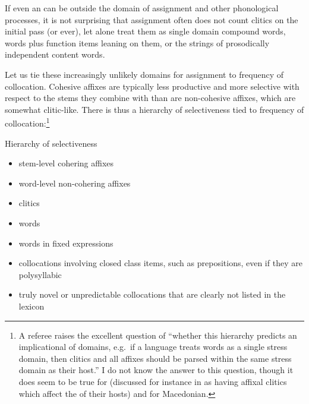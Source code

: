 \documentclass[output=paper,
modfonts
]{LSP/langsci}
\begin{document}
\begin{exe}
\noindent If even an  can be outside the domain of  assignment and other phonological processes, it is not surprising that  assignment often does not count clitics on the initial pass (or ever), let alone treat them as single domain compound words, words plus function items leaning on them, or the strings of prosodically independent content words. 

Let us tie these increasingly unlikely domains for  assignment to frequency of collocation. Cohesive affixes are typically less productive and more selective with respect to the stems they combine with than are non-cohesive affixes, which are somewhat clitic-like. There is thus a hierarchy of selectiveness tied to frequency of collocation:\footnote{A referee raises the excellent question of “whether this hierarchy predicts an implicational  of  domains, e.g.\ if a language treats  words as a single stress domain, then clitics and all affixes should be parsed within the same stress domain as their host.” I do not know the answer to this question, though it does seem to be true for  (discussed for instance in \citealt{anderson2011} as having affixal clitics which affect the  of their hosts) and for Macedonian.} 

\ea \label{ex:kaisse:14} Hierarchy of selectiveness
\begin{itemize}
\item stem-level cohering affixes 
\item word-level non-cohering affixes 
\item clitics
\item {} words
\item words in fixed expressions 
\item collocations involving closed class items, such as prepositions, even if they are polysyllabic
\item truly novel or unpredictable collocations that are clearly not listed in the lexicon
\end{itemize}
\z


\end{exe}
\end{document}
